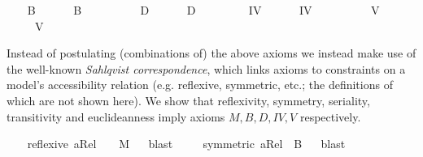 \begin{isabellebody}
\ \ \isamarkupfalse%
\ B\ \isanewline
\ \ \ \ \ {\isachardoublequoteopen}B\ {\isasymequiv}\ \isactrlbold {\isasymforall}{\isasymphi}{\isachardot}\ {\isasymphi}\ \isactrlbold {\isasymrightarrow}\ \ \isactrlbold {\isasymbox}\isactrlbold {\isasymdiamond}{\isasymphi}{\isachardoublequoteclose}\isanewline
\ \ \isamarkupfalse%
\ D\ \isanewline
\ \ \ \ \ {\isachardoublequoteopen}D\ {\isasymequiv}\ \isactrlbold {\isasymforall}{\isasymphi}{\isachardot}\ \isactrlbold {\isasymbox}{\isasymphi}\ \isactrlbold {\isasymrightarrow}\ \isactrlbold {\isasymdiamond}{\isasymphi}{\isachardoublequoteclose}\isanewline
\ \ \isamarkupfalse%
\ IV\ \isanewline
\ \ \ \ \ {\isachardoublequoteopen}IV\ {\isasymequiv}\ \isactrlbold {\isasymforall}{\isasymphi}{\isachardot}\ \isactrlbold {\isasymbox}{\isasymphi}\ \isactrlbold {\isasymrightarrow}\ \ \isactrlbold {\isasymbox}\isactrlbold {\isasymbox}{\isasymphi}{\isachardoublequoteclose}\isanewline
\ \ \isamarkupfalse%
\ V\ \isanewline
\ \ \ \ \ {\isachardoublequoteopen}V\ {\isasymequiv}\ \isactrlbold {\isasymforall}{\isasymphi}{\isachardot}\ \isactrlbold {\isasymdiamond}{\isasymphi}\ \isactrlbold {\isasymrightarrow}\ \isactrlbold {\isasymbox}\isactrlbold {\isasymdiamond}{\isasymphi}{\isachardoublequoteclose}%
\begin{isamarkuptext}%
Instead of postulating (combinations of) the above  axioms we instead make use of 
  the well-known \emph{Sahlqvist correspondence}, which links axioms to constraints on a model's accessibility
  relation (e.g. reflexive, symmetric, etc.; the definitions of which are not shown here). We show
  that  reflexivity, symmetry, seriality, transitivity and euclideanness imply
  axioms $M, B, D, IV, V$ respectively.%
\end{isamarkuptext}\isamarkuptrue%
\ \ \isamarkupfalse%
\ {\isachardoublequoteopen}reflexive\ aRel\ \ {\isasymLongrightarrow}\ \ {\isasymlfloor}M{\isasymrfloor}{\isachardoublequoteclose}%
\isadelimproof
\ %
\endisadelimproof
%
\isatagproof
{}\isamarkupfalse%
\ blast\ %
%
\endisatagproof
{\isafoldproof}%
%
\isadelimproof
%
\endisadelimproof
\isanewline
\ \ \isamarkupfalse%
\ {\isachardoublequoteopen}symmetric\ aRel\ {\isasymLongrightarrow}\ {\isasymlfloor}B{\isasymrfloor}{\isachardoublequoteclose}%
\isadelimproof
\ %
\endisadelimproof
%
\isatagproof
{}\isamarkupfalse%
\ blast%
\endisatagproof

\end{isabellebody}
